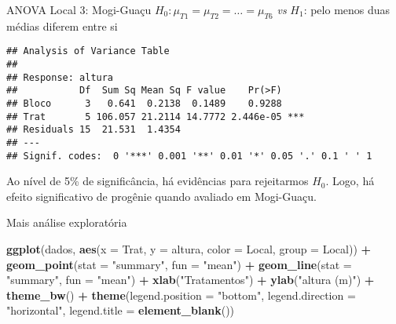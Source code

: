 \documentclass[
  ignorenonframetext,
]{beamer}
\newenvironment{Shaded}{\begin{snugshade}}{\end{snugshade}}
\newcommand{\AttributeTok}[1]{\textcolor[rgb]{0.13,0.29,0.53}{#1}}
\newcommand{\FunctionTok}[1]{\textcolor[rgb]{0.13,0.29,0.53}{\textbf{#1}}}
\newcommand{\NormalTok}[1]{#1}
\newcommand{\SpecialCharTok}[1]{\textcolor[rgb]{0.81,0.36,0.00}{\textbf{#1}}}
\newcommand{\StringTok}[1]{\textcolor[rgb]{0.31,0.60,0.02}{#1}}
\begin{document}
\begin{frame}[fragile]{ANOVA Local 3: Mogi-Guaçu}
\protect\hypertarget{anova-local-3-mogi-guauxe7u-1}{}
\(H_0: \mu_{T1} = \mu_{T2} = \ldots = \mu_{T6}\) \emph{vs} \(H_1\): pelo
menos duas médias diferem entre si

\begin{verbatim}
## Analysis of Variance Table
## 
## Response: altura
##           Df  Sum Sq Mean Sq F value    Pr(>F)    
## Bloco      3   0.641  0.2138  0.1489    0.9288    
## Trat       5 106.057 21.2114 14.7772 2.446e-05 ***
## Residuals 15  21.531  1.4354                      
## ---
## Signif. codes:  0 '***' 0.001 '**' 0.01 '*' 0.05 '.' 0.1 ' ' 1
\end{verbatim}

Ao nível de 5\% de significância, há evidências para rejeitarmos
\(H_0\). Logo, há efeito significativo de progênie quando avaliado em
Mogi-Guaçu.
\end{frame}

\begin{frame}[fragile]{Mais análise exploratória}
\protect\hypertarget{mais-anuxe1lise-exploratuxf3ria}{}
\begin{Shaded}
\begin{Highlighting}[]
\FunctionTok{ggplot}\NormalTok{(dados,}
       \FunctionTok{aes}\NormalTok{(}\AttributeTok{x =}\NormalTok{ Trat,}
           \AttributeTok{y =}\NormalTok{ altura,}
           \AttributeTok{color =}\NormalTok{ Local,}
           \AttributeTok{group =}\NormalTok{ Local)) }\SpecialCharTok{+} 
  \FunctionTok{geom\_point}\NormalTok{(}\AttributeTok{stat =} \StringTok{"summary"}\NormalTok{,}
             \AttributeTok{fun =} \StringTok{"mean"}\NormalTok{) }\SpecialCharTok{+}
  \FunctionTok{geom\_line}\NormalTok{(}\AttributeTok{stat =} \StringTok{"summary"}\NormalTok{,}
             \AttributeTok{fun =} \StringTok{"mean"}\NormalTok{) }\SpecialCharTok{+}
  \FunctionTok{xlab}\NormalTok{(}\StringTok{"Tratamentos"}\NormalTok{) }\SpecialCharTok{+}
  \FunctionTok{ylab}\NormalTok{(}\StringTok{"altura (m)"}\NormalTok{) }\SpecialCharTok{+}
  \FunctionTok{theme\_bw}\NormalTok{() }\SpecialCharTok{+}
  \FunctionTok{theme}\NormalTok{(}\AttributeTok{legend.position =} \StringTok{"bottom"}\NormalTok{,}
        \AttributeTok{legend.direction =} \StringTok{"horizontal"}\NormalTok{,}
        \AttributeTok{legend.title =} \FunctionTok{element\_blank}\NormalTok{())}
\end{Highlighting}
\end{Shaded}
\end{frame}
\end{document}
